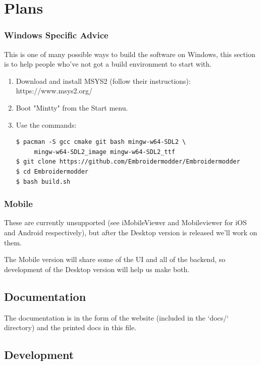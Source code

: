 \documentclass[a4paper, 11pt]{report}
\begin{document}
\section{Plans}

\subsubsection{Windows Specific Advice}

This is one of many possible ways to build the software on Windows,
this section is to help people who've not got a build environment to start with.

\begin{enumerate}
\item Download and install MSYS2 (follow their instructions): https://www.msys2.org/
\item Boot "Mintty" from the Start menu.
\item Use the commands:

\begin{lstlisting}
$ pacman -S gcc cmake git bash mingw-w64-SDL2 \
     mingw-w64-SDL2_image mingw-w64-SDL2_ttf
$ git clone https://github.com/Embroidermodder/Embroidermodder
$ cd Embroidermodder
$ bash build.sh
\end{lstlisting}
\end{enumerate}

\subsubsection{Mobile}

These are currently unsupported (see iMobileViewer and Mobileviewer for
iOS and Android respectively), but after the Desktop version is
released we'll work on them.

The Mobile version will share some of the UI and all of the backend,
so development of the Desktop version will help us make both.

\subsection{Documentation}

The documentation is in the form of the website (included in the `docs/`
directory) and the printed docs in this file.

\subsection{Development}
\end{document}
